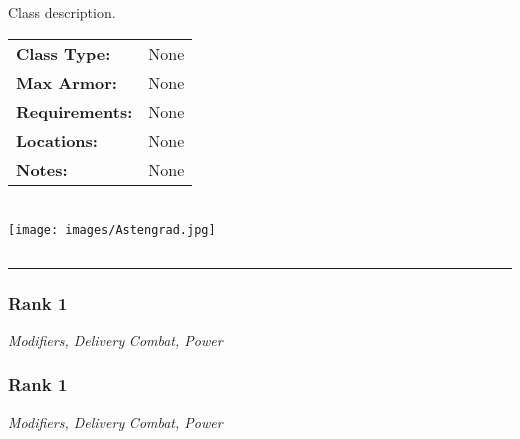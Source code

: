 \documentclass[11pt]{article}
\begin{document}
\begin{multicols}{2}

\section*{}
Class description. \\

\hspace{-0.8cm}
{
\begin{tabular}{ p{2.25cm} p{6.5cm} }
\rowcolor{gray0}
    \multicolumn{2}{c}{\textbf{Class Specs}} \\
\hline
    \textbf{Class Type:}   & None \\
    \textbf{Max Armor:}    & None \\
    \textbf{Requirements:} & None \\
    \textbf{Locations:}    & None \\
    \textbf{Notes:}        & None
\end{tabular}
} \\

\Centering
\texttt{[image: images/Astengrad.jpg]} \\

\subsection*{}
\vspace{-10pt}
\hrule
\vspace{2pt}

\subsubsection*{ \hfill Rank 1}
\vspace{-3pt}
\textit{Modifiers, Delivery} \hfill \textit{Combat, Power} \vspace{5pt} \\
\noindent
{}

\subsubsection*{ \hfill Rank 1}
\vspace{-3pt}
\textit{Modifiers, Delivery} \hfill \textit{Combat, Power} \vspace{5pt} \\


\end{multicols}
\end{document}
